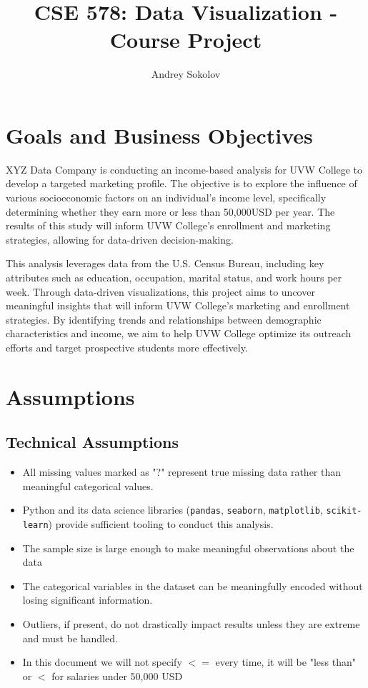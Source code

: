\documentclass[journal,onecolumn]{IEEEtran}
\begin{document}
\title{CSE 578: Data Visualization - Course Project}

\author{Andrey Sokolov}

\maketitle


\section{Goals and Business Objectives}
XYZ Data Company is conducting an income-based analysis for UVW College to develop
a targeted marketing profile. The objective is to explore the influence of various
socioeconomic factors on an individual’s income level, specifically determining
whether they earn more or less than 50,000USD per year. 
The results of this study will inform UVW College’s enrollment and marketing strategies,
allowing for data-driven decision-making. 

This analysis leverages data from the U.S. Census Bureau, including key attributes
such as education, occupation, marital status, and work hours per week. Through
data-driven visualizations, this project aims to uncover
meaningful insights that will inform UVW College’s marketing and enrollment strategies.
By identifying trends and relationships between demographic characteristics and income,
we aim to help UVW College optimize its outreach efforts and target prospective
students more effectively.

\section{Assumptions}

\subsection{Technical Assumptions}
\begin{itemize}
    \item All missing values marked as "?" represent true missing data rather than meaningful categorical values.
    \item Python and its data science libraries (\texttt{pandas}, \texttt{seaborn}, \texttt{matplotlib}, \texttt{scikit-learn}) provide sufficient tooling to conduct this analysis.
    \item The sample size is large enough to make meaningful observations about the data
    \item The categorical variables in the dataset can be meaningfully encoded without losing significant information.
    \item Outliers, if present, do not drastically impact results unless they are extreme and must be handled.
    \item In this document we will not specify $<=$ every time, it will be "less than" or $<$ for salaries under 50,000 USD
\end{itemize}
\end{document}
